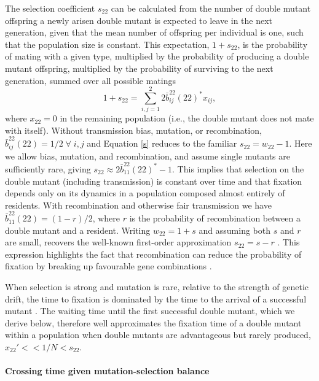 \documentclass[review,3p,authoryear]{elsarticle}
\begin{document}
The selection coefficient $s_{22}$ can be calculated from the number of double mutant offspring a newly arisen double mutant is expected to leave in the next generation, given that the mean number of offspring per individual is one, such that the population size is constant.
This expectation, $1 + s_{22}$, is the probability of mating with a given type, multiplied by the probability of producing a double mutant offspring, multiplied by the probability of surviving to the next generation, summed over all possible matings
\begin{equation}\label{s}
1 + s_{22} = \sum_{i,j=1}^{2} 2\bar{b}_{ij}^{22}(22)^* x_{ij}, 
\end{equation}  
where $x_{22} = 0$ in the remaining population (i.e., the double mutant does not mate with itself).
Without transmission bias, mutation, or recombination, $\bar{b}_{ij}^{22}(22) = 1/2 \; \forall \; i,j$ and Equation \eqref{s} reduces to the familiar $s_{22} = w_{22} - 1$.
Here we allow bias, mutation, and recombination, and assume single mutants are sufficiently rare, giving $s_{22}\approx 2\bar{b}_{11}^{22}(22)^*-1$.
This implies that selection on the double mutant (including transmission) is constant over time and that fixation depends only on its dynamics in a population composed almost entirely of residents. 
With recombination and otherwise fair transmission we have $\bar{b}_{11}^{22}(22) = (1 - r)/2$, where $r$ is the probability of recombination between a double mutant and a resident.
Writing $w_{22} = 1 + s$ and assuming both $s$ and $r$ are small, recovers the well-known first-order approximation $s_{22} = s - r$ \citep{Crow1965}.
This expression highlights the fact that recombination can reduce the probability of fixation by breaking up favourable gene combinations \citep{Crow1965}.

When selection is strong and mutation is rare, relative to the strength of genetic drift, the time to fixation is dominated by the time to the arrival of a successful mutant \citep{Gillespie1984a,Weinreich2005,Weissman2010}.
The waiting time until the first successful double mutant, which we derive below, therefore well approximates the fixation time of a double mutant within a population when double mutants are advantageous but rarely produced, $x_{22}' << 1/N < s_{22}$.

\paragraph{Crossing time given mutation-selection balance}
\end{document}
